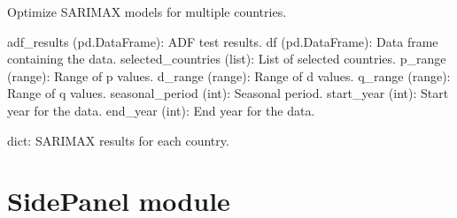 \documentclass[letterpaper,10pt,english]{sphinxmanual}
\begin{document}

\begin{fulllineitems}
\label{\detokenize{Sarimax:Sarimax.optimize_sarimax_models}}
\pysigstartsignatures
{}
\pysigstopsignatures
\sphinxAtStartPar
Optimize SARIMAX models for multiple countries.
\begin{description}
\sphinxAtStartPar
adf\_results (pd.DataFrame): ADF test results.
df (pd.DataFrame): Data frame containing the data.
selected\_countries (list): List of selected countries.
p\_range (range): Range of p values.
d\_range (range): Range of d values.
q\_range (range): Range of q values.
seasonal\_period (int): Seasonal period.
start\_year (int): Start year for the data.
end\_year (int): End year for the data.

\sphinxAtStartPar
dict: SARIMAX results for each country.

\end{description}

\end{fulllineitems}


\sphinxstepscope


\section{SidePanel module}
\label{\detokenize{SidePanel:module-SidePanel}}\label{\detokenize{SidePanel:sidepanel-module}}\label{\detokenize{SidePanel::doc}}
\end{document}
